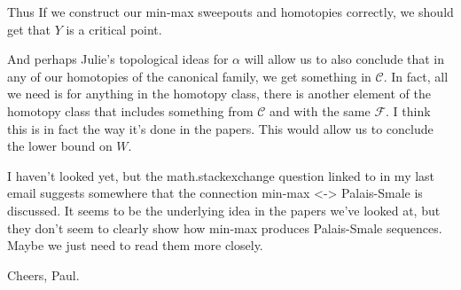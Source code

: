 \documentclass[12pt, a4paper]{amsart}
\theoremstyle{remark}
\begin{document}
Thus If we construct our min-max sweepouts and homotopies correctly,
we should get that $Y$ is a critical point.

And perhaps Julie's topological ideas for $\alpha$ will allow us to
also conclude that in any of our homotopies of the canonical family,
we get something in $\mathcal{C}$. In fact, all we need is for
anything in the homotopy class, there is another element of the
homotopy class that includes something from $\mathcal{C}$ and with the
same $\mathcal{F}$. I think this is in fact the way it's done in the
papers. This would allow us to conclude the lower bound on $W$.

I haven't looked yet, but the math.stackexchange question linked to in
my last email suggests somewhere that the connection min-max <->
Palais-Smale is discussed. It seems to be the underlying idea in the
papers we've looked at, but they don't seem to clearly show how
min-max produces Palais-Smale sequences. Maybe we just need to read
them more closely.

Cheers,
Paul.


 
\end{document}
